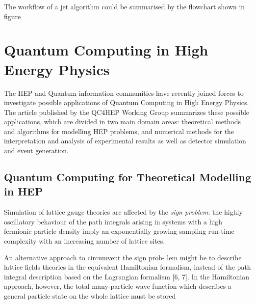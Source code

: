 The workflow of a jet algorithm could be summarised by the flowchart shown in figure 


\section{Quantum Computing in High Energy Physics}

The HEP and Quantum information communities have recently joined forces to investigate possible 
applications of Quantum Computing in High Energy Physics.
The article published by the QC4HEP Working Group summarizes these possible applications, which are divided in 
two main domain areas: theoretical methods and algorithms for modelling HEP problems, and numerical methods 
for the interpretation and analysis of experimental results as well as detector simulation and event generation.

\subsection{Quantum Computing for Theoretical Modelling in HEP}

Simulation of lattice gauge theories are affected by the \textit{sign problem}: the highly oscillatory behaviour of 
the path integrals arising in systems with a high fermionic particle density imply an exponentially growing sampling 
run-time complexity with an increasing number of lattice sites.

An alternative approach to circumvent the sign prob- lem might be to describe lattice fields theories 
in the equivalent Hamiltonian formalism, instead of the path integral description based on the Lagrangian formalism 
[6, 7]. In the Hamiltonian approach, however, the total many-particle wave function which describes a general particle 
state on the whole lattice must be stored









